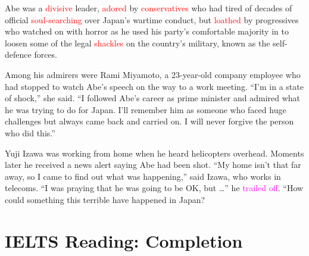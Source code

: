 \documentclass[12pt,a4paper]{article}
\begin{document}
    \par Abe was a \textcolor{red}{divisive}\cite{divisive} leader, \textcolor{red}{adored}\cite{adored} by \textcolor{red}{conservatives}\cite{conservatives} who had tired of decades of official \textcolor{red}{soul-searching}\cite{soul-searching} over Japan’s wartime conduct, but \textcolor{red}{loathed}\cite{loathed} by progressives who watched on with horror as he used his party’s comfortable majority in to loosen some of the legal \textcolor{red}{shackles}\cite{shackles} on the country’s military, known as the self-defence forces.

    \par Among his admirers were Rami Miyamoto, a 23-year-old company employee who had stopped to watch Abe’s speech on the way to a work meeting. “I’m in a state of shock,” she said. “I followed Abe’s career as prime minister and admired what he was trying to do for Japan. I’ll remember him as someone who faced huge challenges but always came back and carried on. I will never forgive the person who did this.”

    \par Yuji Izawa was working from home when he heard helicopters overhead. Moments later he received a news alert saying Abe had been shot. “My home isn’t that far away, so I came to find out what was happening,” said Izawa, who works in telecoms. “I was praying that he was going to be OK, but …” he \textcolor{magenta}{trailed off}\cite{trailed_off}. “How could something this terrible have happened in Japan?

    \printbibliography

\newcommand{\redhighlight}{\textcolor{red}}


\section{IELTS Reading: Completion}
\end{document}
